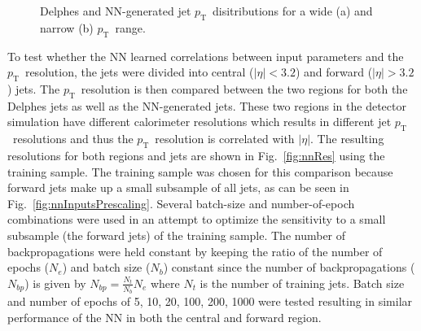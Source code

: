 \documentclass[showpacs,showkeys,preprint,prd,nofootinbib,linenumbers,12pt,superscriptaddress]{revtex4-1}
\def\pt{\ensuremath{p_{\mathrm{T}}}}
\begin{document}
\begin{figure}[htb]
  \caption{Delphes and NN-generated jet \pt\ disitributions for a wide (a) and narrow (b) \pt\ range.}
  \label{fig:pTNNVsDelphes}
\end{figure}

To test whether the NN learned correlations between input parameters and the \pt\ resolution, the jets were divided into central ($|\eta|<3.2$) and forward ($|\eta|>3.2$) jets. The \pt\ resolution is then compared between the two regions for both the Delphes jets as well as the NN-generated jets. These two regions in the detector simulation have different calorimeter resolutions which results in different jet \pt\ resolutions and thus the \pt\ resolution is correlated with $|\eta|$. The resulting resolutions for both regions and jets are shown in Fig.~\ref{fig:nnRes} using the training sample. The training sample was chosen for this comparison because forward jets make up a small subsample of all jets, as can be seen in Fig.~\ref{fig:nnInputsPrescaling}. Several batch-size and number-of-epoch combinations were used in an attempt to optimize the sensitivity to a small subsample (the forward jets) of the training sample. The number of backpropagations were held constant by keeping the ratio of the number of epochs ($N_e$) and batch size ($N_b$) constant since the number of backpropagations ($N_{bp}$) is given by $N_{bp}=\frac{N_t}{N_b}N_e$ where $N_t$ is the number of training jets. Batch size and number of epochs of 5, 10, 20, 100, 200, 1000 were tested resulting in similar performance of the NN in both the central and forward region.
\end{document}
